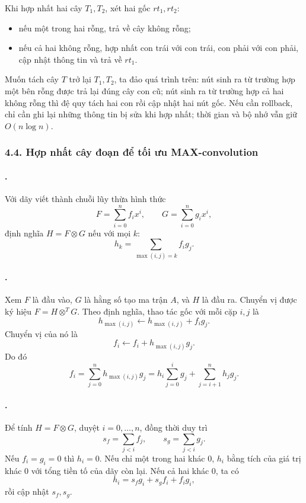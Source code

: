 \documentclass[11pt]{article}
\begin{document}
Khi hợp nhất hai cây \(T_1,T_2\), xét hai gốc \(rt_1,rt_2\):
\begin{itemize}
  \item nếu một trong hai rỗng, trả về cây không rỗng;
  \item nếu cả hai không rỗng, hợp nhất con trái với con trái, con phải với con
  phải, cập nhật thông tin và trả về \(rt_1\).
\end{itemize}
Muốn tách cây \(T\) trở lại \(T_1,T_2\), ta đảo quá trình trên: nút sinh ra từ
trường hợp một bên rỗng được trả lại đúng cây con cũ; nút sinh ra từ trường hợp
cả hai không rỗng thì đệ quy tách hai con rồi cập nhật hai nút gốc. Nếu cần
rollback, chỉ cần ghi lại những thông tin bị sửa khi hợp nhất; thời gian và bộ
nhớ vẫn giữ \(O(n\log n)\).

\subsubsection*{4.4. Hợp nhất cây đoạn để tối ưu MAX-convolution}

\paragraph{.}
Với dãy viết thành chuỗi lũy thừa hình thức
\[
  F=\sum_{i=0}^{n} f_i x^i,\qquad G=\sum_{i=0}^{n} g_i x^i,
\]
định nghĩa \(H=F\otimes G\) nếu với mọi \(k\):
\[
  h_k=\sum_{\max(i,j)=k} f_i g_j.
\]

\paragraph{.}
Xem \(F\) là đầu vào, \(G\) là hằng số tạo ma trận \(A\), và \(H\) là đầu ra.
Chuyển vị được ký hiệu \(F=H\otimes^T G\). Theo định nghĩa, thao tác gốc với
mỗi cặp \(i,j\) là
\[
  h_{\max(i,j)}\leftarrow h_{\max(i,j)}+f_i g_j.
\]
Chuyển vị của nó là
\[
  f_i\leftarrow f_i+h_{\max(i,j)}g_j.
\]
Do đó
\[
  f_i=\sum_{j=0}^{n} h_{\max(i,j)}g_j
      =h_i\sum_{j=0}^{i}g_j+\sum_{j=i+1}^{n}h_jg_j.
\]

\paragraph{.}
Để tính \(H=F\otimes G\), duyệt \(i=0,\ldots,n\), đồng thời duy trì
\[
  s_f=\sum_{j<i}f_j,\qquad s_g=\sum_{j<i}g_j.
\]
Nếu \(f_i=g_i=0\) thì \(h_i=0\). Nếu chỉ một trong hai khác \(0\), \(h_i\) bằng
tích của giá trị khác \(0\) với tổng tiền tố của dãy còn lại. Nếu cả hai khác
\(0\), ta có
\[
  h_i=s_f g_i+s_g f_i+f_i g_i,
\]
rồi cập nhật \(s_f,s_g\).
\end{document}
